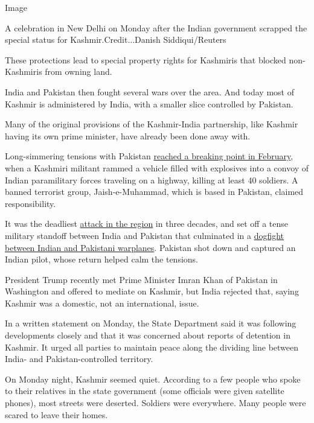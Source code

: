 Image

A celebration in New Delhi on Monday after the Indian government
scrapped the special status for Kashmir.Credit...Danish Siddiqui/Reuters

These protections lead to special property rights for Kashmiris that
blocked non-Kashmiris from owning land.

India and Pakistan then fought several wars over the area. And today
most of Kashmir is administered by India, with a smaller slice
controlled by Pakistan.

Many of the original provisions of the Kashmir-India partnership, like
Kashmir having its own prime minister, have already been done away with.

Long-simmering tensions with Pakistan
\href{https://www.nytimes.com/2019/02/15/world/asia/kashmir-attack-pulwama.html}{reached
a breaking point in February}, when a Kashmiri militant rammed a vehicle
filled with explosives into a convoy of Indian paramilitary forces
traveling on a highway, killing at least 40 soldiers. A banned terrorist
group, Jaish-e-Muhammad, which is based in Pakistan, claimed
responsibility.

It was the deadliest
\href{https://www.nytimes.com/2019/02/15/world/asia/kashmir-attack-pulwama.html?module=inline}{attack
in the region} in three decades, and set off a tense military standoff
between India and Pakistan that culminated in a
\href{https://www.nytimes.com/2019/03/01/world/asia/india-pakistan-plane-abhinandan-varthaman-india.html?module=inline}{dogfight
between Indian and Pakistani warplanes}. Pakistan shot down and captured
an Indian pilot, whose return helped calm the tensions.

President Trump recently met Prime Minister Imran Khan of Pakistan in
Washington and offered to mediate on Kashmir, but India rejected that,
saying Kashmir was a domestic, not an international, issue.

In a written statement on Monday, the State Department said it was
following developments closely and that it was concerned about reports
of detention in Kashmir. It urged all parties to maintain peace along
the dividing line between India- and Pakistan-controlled territory.

On Monday night, Kashmir seemed quiet. According to a few people who
spoke to their relatives in the state government (some officials were
given satellite phones), most streets were deserted. Soldiers were
everywhere. Many people were scared to leave their homes.

